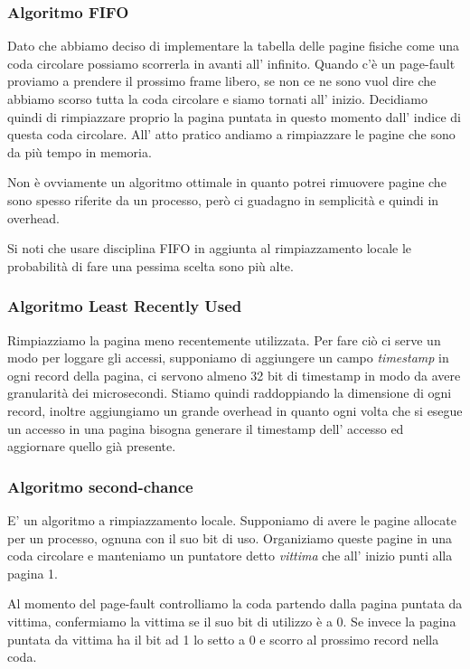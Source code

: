\subsubsection{Algoritmo FIFO}
Dato che abbiamo deciso di implementare la tabella delle pagine fisiche come una coda circolare possiamo scorrerla in avanti all' infinito.
Quando c'è un page-fault proviamo a prendere il prossimo frame libero, se non ce ne sono vuol dire che abbiamo scorso tutta la coda circolare e siamo tornati all' inizio.
Decidiamo quindi di rimpiazzare proprio la pagina puntata in questo momento dall' indice di questa coda circolare.
All' atto pratico andiamo a rimpiazzare le pagine che sono da più tempo in memoria.

Non è ovviamente un algoritmo ottimale in quanto potrei rimuovere pagine che sono spesso riferite da un processo, però ci guadagno in semplicità e quindi in overhead.

Si noti che usare disciplina FIFO in aggiunta al rimpiazzamento locale le probabilità di fare una pessima scelta sono più alte.

\subsubsection{Algoritmo Least Recently Used}
Rimpiazziamo la pagina meno recentemente utilizzata.
Per fare ciò ci serve un modo per loggare gli accessi, supponiamo di aggiungere un campo \emph{timestamp} in ogni record della pagina, ci servono almeno 32 bit di timestamp in modo da avere granularità dei microsecondi.
Stiamo quindi raddoppiando la dimensione di ogni record, inoltre aggiungiamo un grande overhead in quanto ogni volta che si esegue un accesso in una pagina bisogna generare il timestamp dell' accesso ed aggiornare quello già presente.

\subsubsection{Algoritmo second-chance}
E' un algoritmo a rimpiazzamento locale.
Supponiamo di avere le pagine allocate per un processo, ognuna con il suo bit di uso.
Organiziamo queste pagine in una coda circolare e manteniamo un puntatore detto \emph{vittima} che all' inizio punti alla pagina 1.

Al momento del page-fault controlliamo la coda partendo dalla pagina puntata da vittima, confermiamo la vittima se il suo bit di utilizzo è a 0.
Se invece la pagina puntata da vittima ha il bit ad 1 lo setto a 0 e scorro al prossimo record nella coda.

